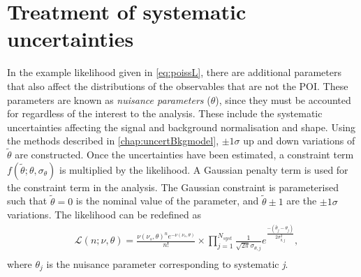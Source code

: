 \section{Treatment of systematic uncertainties}\label{sec:stats:nps}
In the example likelihood given in \cref{eq:poissL}, there are additional parameters that also affect the distributions of the observables that are not the POI. These parameters are known as \emph{nuisance parameters} ($\theta$), since they must be accounted for regardless of the interest to the analysis. These include the systematic uncertainties affecting the signal and background normalisation and shape. Using the methods described in \cref{chap:uncertBkgmodel}, $\pm 1\sigma$ up and down variations of $\tilde{\theta}$ are constructed. Once the uncertainties have been estimated, a constraint term $f(\tilde{\theta};\theta,\sigma_\theta)$ is multiplied by the likelihood. A Gaussian penalty term is used for the constraint term in the analysis. The Gaussian constraint is parameterised such that $\tilde{\theta} = 0$ is the nominal value of the parameter, and $\tilde{\theta} \pm 1$ are the $\pm1\sigma$ variations. The likelihood can be redefined as
\begin{equation}
    \label{eq:likelihood}
    \begin{aligned}
        & \mathcal{L}(n;\nu,\theta) = \frac{\nu(\nu_s,\theta)^{n} e^{-\nu(\nu_s,\theta)}}{n!} \times \prod_{j=1}^{N_{syst}} \frac{1}{\sqrt{2\pi}\sigma_{\theta,j}} e^\frac{-(\tilde{\theta_j} - \theta_j)}{2\sigma_{\theta,j}^2} , \\
    \end{aligned}
\end{equation}
where $\theta_j$ is the nuisance parameter corresponding to systematic \emph{j}. 

